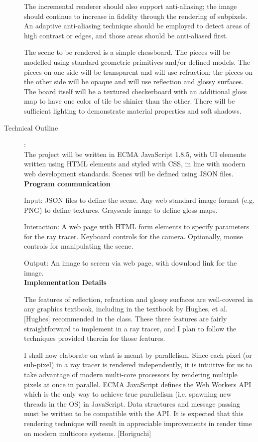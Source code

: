 \documentclass[12pt]{article}
\begin{document}
\begin{description}
	The incremental renderer should also support anti-aliasing; the image should
	continue to increase in fidelity through the rendering of subpixels. An adaptive
	anti-aliasing technique should be employed to detect areas of high contrast or edges,
	and those areas should be anti-aliased first.

	The scene to be rendered is a simple chessboard. The pieces will be modelled
	using standard geometric primitives and/or defined models. The pieces on
	one side will be transparent and will use refraction; the pieces on the other side
	will be opaque and will use reflection and glossy surfaces. The board itself
	will be a textured checkerboard with an additional gloss map to have one color
	of tile be shinier than the other. There will be sufficient lighting to
	demonstrate material properties and soft shadows.

\item[Technical Outline]:\\
	The project will be written in ECMA JavaScript 1.8.5, with UI elements written
	using HTML elements and styled with CSS, in line with modern web development
	standards. Scenes will be defined using JSON files. \\
	
	{\bf Program communication }
	
	Input: JSON files to define the scene. Any web standard image format (e.g. PNG) to
	define textures. Grayscale image to define gloss maps.
	
	Interaction: A web page with HTML form elements to specify parameters for the
	ray tracer. Keyboard controls for the camera. Optionally, mouse controls
	for manipulating the scene.
	
	Output: An image to screen via web page, with download link for the image. \\
    
	{\bf Implementation Details }
	
	The features of reflection, refraction and glossy surfaces are well-covered in
    any graphics textbook, including in the textbook by Hughes, et al. [Hughes] 
    recommended in the class. These three features are fairly straightforward to implement
    in a ray tracer, and I plan to follow the techniques provided therein for those 
    features.
    
    I shall now elaborate on what is meant by parallelism. Since each pixel (or
    sub-pixel) in a ray tracer is rendered independently, it is intuitive for us
    to take advantage of modern multi-core processors by rendering multiple pixels at
    once in parallel. ECMA JavaScript defines the Web Workers API which is the
    only way to achieve true parallelism (i.e. spawning new threads in the OS) in
    JavaScript. Data structures and message passing must be written to be compatible
    with the API. It is expected that this rendering technique will result in
    appreciable improvements in render time on modern multicore systems. [Horiguchi]
    

\end{description}
\end{document}
